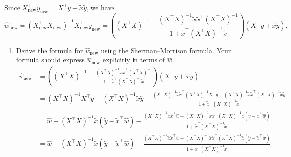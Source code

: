 \documentclass[a3paper,12pt]{extarticle} %
\begin{document}
\begin{enumerate}
        Since \( X_{\text{new}}^\top y_{\text{new}} = X^\top y + \tilde{x} \tilde{y} \), we have
        \[
        \hat{w}_{\text{new}} = (X_{\text{new}}^\top X_{\text{new}})^{-1} X_{\text{new}}^\top y_{\text{new}} = \left( (X^\top X)^{-1} - \frac{(X^\top X)^{-1} \tilde{x} \tilde{x}^\top (X^\top X)^{-1}}{1 + \tilde{x}^\top (X^\top X)^{-1} \tilde{x}} \right) (X^\top y + \tilde{x} \tilde{y}).
        \]

        \begin{enumerate}
            \item Derive the formula for \( \hat{w}_{\text{new}} \) using the Sherman–Morrison formula. Your formula should express \( \hat{w}_{\text{new}} \) explicitly in terms of \( \hat{w} \).
            \[
            \begin{aligned}
            \hat{w}_{\text{new}} &= \left( (X^\top X)^{-1} - \frac{(X^\top X)^{-1} \tilde{x} \tilde{x}^\top (X^\top X)^{-1}}{1 + \tilde{x}^\top (X^\top X)^{-1} \tilde{x}} \right) (X^\top y + \tilde{x} \tilde{y}) \\
            &= (X^\top X)^{-1} X^\top y + (X^\top X)^{-1} \tilde{x} \tilde{y} - \frac{(X^\top X)^{-1} \tilde{x} \tilde{x}^\top (X^\top X)^{-1} X^\top y + (X^\top X)^{-1} \tilde{x} \tilde{x}^\top (X^\top X)^{-1} \tilde{x} \tilde{y}}{1 + \tilde{x}^\top (X^\top X)^{-1} \tilde{x}} \\
            &= \hat{w} + (X^\top X)^{-1} \tilde{x} (\tilde{y} - \tilde{x}^\top \hat{w}) - \frac{(X^\top X)^{-1} \tilde{x} \tilde{x}^\top \hat{w} + (X^\top X)^{-1} \tilde{x} \tilde{x}^\top (X^\top X)^{-1} \tilde{x} (\tilde{y} - \tilde{x}^\top \hat{w})}{1 + \tilde{x}^\top (X^\top X)^{-1} \tilde{x}} \\
            &= \hat{w} + (X^\top X)^{-1} \tilde{x} (\tilde{y} - \tilde{x}^\top \hat{w}) - \frac{(X^\top X)^{-1} \tilde{x} \tilde{x}^\top \hat{w} + (X^\top X)^{-1} \tilde{x} \tilde{x}^\top (X^\top X)^{-1} \tilde{x} (\tilde{y} - \tilde{x}^\top \hat{w})}{1 + \tilde{x}^\top (X^\top X)^{-1} \tilde{x}}
            \end{aligned}
            \]
           

\end{enumerate}
\end{enumerate}
\end{document}
